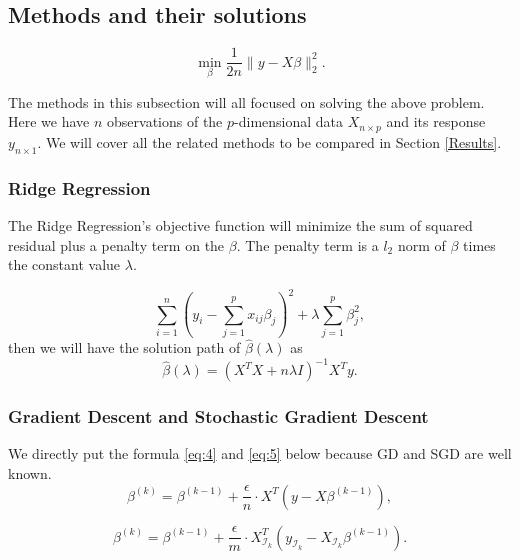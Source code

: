 \documentclass[11pt]{article}
\begin{document}
\subsection{Methods and their solutions} \label{Methods}
\begin{equation}
\underset{\beta}{\operatorname{min}} \frac{1}{2 n}\|y-X \beta\|_{2}^{2} .
\end{equation}

The methods in this subsection will all focused on solving the above problem. Here we have $n$ observations of the $p$-dimensional data $X_{n \times p}$ and its response $y_{n \times 1}$. We will cover all the related methods to be compared in Section \ref{Results}.

\subsubsection{Ridge Regression}

The Ridge Regression's objective function will minimize the sum of squared residual plus a penalty term on the $\beta$. The penalty term is a $l_2$ norm of $\beta$ times the constant value $\lambda$.

\begin{equation}
    \sum_{i=1}^{n}\left(y_{i}-\sum_{j=1}^{p} x_{i j} \beta_{j}\right)^{2}+\lambda \sum_{j=1}^{p} \beta_{j}^{2} ,
\end{equation}
then we will have the solution path of $\hat{\beta}(\lambda)$ as
\begin{equation}
\label{eq:3}
    \hat{\beta}(\lambda)=\left(X^{T} X+n \lambda I\right)^{-1} X^{T} y .
\end{equation}

\subsubsection{Gradient Descent and Stochastic Gradient Descent}  
We directly put the formula \ref{eq:4} and \ref{eq:5} below because GD and SGD are well known.
\begin{equation}
\label{eq:4}
    \beta^{(k)} =\beta^{(k-1)}+\frac{\epsilon}{n} \cdot X^{T}\left(y-X \beta^{(k-1)}\right) ,
\end{equation}

\begin{equation}
\label{eq:5}
    \beta^{(k)} =\beta^{(k-1)}+\frac{\epsilon}{m} \cdot X_{\mathcal{I}_{k}}^{T}\left(y_{\mathcal{I}_{k}}-X_{\mathcal{I}_{k}} \beta^{(k-1)}\right) .
\end{equation}
\end{document}
